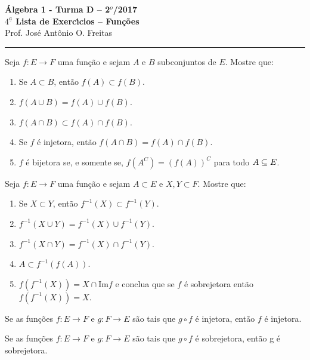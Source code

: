 \documentclass[12pt]{article}
\begin{document}


\begin{center}
{\Large\bf {\'A}lgebra 1 - Turma D -- 2$^{o}$/2017} \\ \vspace{9pt} {\large\bf
  $4^{\underline{a}}$ Lista de Exerc{\'\i}cios -- Funções}\\
\vspace{9pt} Prof. Jos{\'e} Ant{\^o}nio O. Freitas
\end{center}
\hrule

\vspace{.6cm}

\questao Seja $f:E\to F$ uma fun{\c c}{\~a}o e sejam $A$ e $B$ subconjuntos de $E$. Mostre que:
\begin{enumerate}[label={\alph*})]
\item Se $A\subset B$, ent{\~a}o $f(A)\subset f(B)$.
\item $f(A\cup B)=f(A)\cup f(B)$.
\item $f(A\cap B)\subset f(A)\cap f(B)$.
\item Se $f$ {\'e} injetora, ent{\~a}o $f(A\cap B) =  f(A)\cap f(B)$.
\item $f$ {\'e} bijetora se, e somente se, $f(A^C) = (f(A))^C$ para todo $A \subseteq E$.
\end{enumerate}

\vesp

\questao Seja $f:E\to F$ uma fun{\c c}{\~a}o e sejam $A\subset
E$ e $X, Y\subset F$. Mostre que:
\begin{enumerate}[label={\alph*})]
\item Se $X\subset Y$, ent{\~a}o $f^{-1}(X)\subset f^{-1}(Y)$.
\item $f^{-1}(X\cup Y)=f^{-1}(X)\cup f^{-1}(Y)$.
\item $f^{-1}(X\cap Y)= f^{-1}(X)\cap f^{-1}(Y)$.
\item $A\subset f^{-1}(f(A))$.
\item $f(f^{-1}(X))= X \cap \mbox{Im}f$ e conclua que se $f$ {\'e} sobrejetora ent{\~a}o
$f(f^{-1}(X))=X$.
\end{enumerate}

\vesp

\questao Se as fun{\c c}{\~o}es $f:E\to F$ e $g: F\to E$ s{\~a}o
tais que $g\circ f$ {\'e} injetora, ent{\~a}o $f$ {\'e} injetora.

\vesp

\questao Se as fun{\c c}{\~o}es $f:E\to F$ e $g: F\to E$ s{\~a}o
tais que $g\circ f$ {\'e} sobrejetora, ent{\~a}o g {\'e} sobrejetora.
\end{document}
